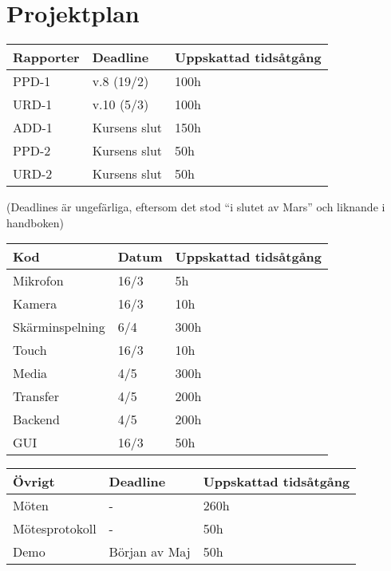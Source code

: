 \documentclass[a4paper,10pt]{article}
\begin{document}
\section{Projektplan}


\begin{center}
    \begin{tabular}{ | l | l | l |}
    \hline
    Rapporter & Deadline & Uppskattad tidsåtgång \\ \hline
    PPD-1 & v.8 (19/2) & 100h \\ \hline
    URD-1 & v.10 (5/3) & 100h \\ \hline
    ADD-1 & Kursens slut & 150h \\ \hline
    PPD-2 & Kursens slut & 50h \\ \hline
    URD-2 & Kursens slut & 50h \\ \hline
    \end{tabular}
\end{center}

(Deadlines är ungefärliga, eftersom det stod “i slutet av Mars” och liknande i handboken)

\begin{center}
    \begin{tabular}{ | l | l | l |}
    \hline
    Kod & Datum & Uppskattad tidsåtgång \\ \hline
    Mikrofon & 16/3 & 5h \\ \hline
    Kamera & 16/3 & 10h  \\ \hline
    Skärminspelning & 6/4 & 300h \\ \hline
    Touch & 16/3 & 10h \\ \hline
    Media & 4/5 & 300h \\ \hline
    Transfer & 4/5 & 200h \\ \hline
    Backend & 4/5 & 200h \\ \hline
    GUI & 16/3 & 50h \\ \hline
    \end{tabular}
\end{center}

\begin{center}
    \begin{tabular}{ | l | l | l | }
    \hline
    Övrigt & Deadline & Uppskattad tidsåtgång \\ \hline
    Möten & - & 260h \\ \hline
    Mötesprotokoll & - & 50h \\ \hline
    Demo & Början av Maj & 50h \\ \hline
    \end{tabular}
\end{center}
\end{document}
